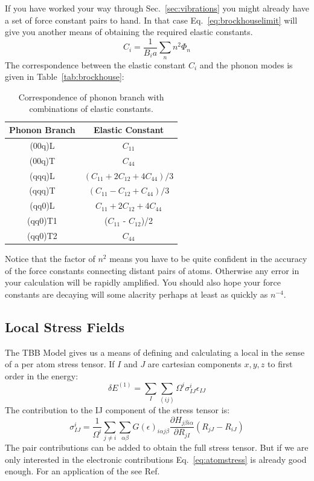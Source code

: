 If you have worked your way through Sec.~\ref{sec:vibrations} you might already have
a set of force constant pairs to hand. In that case Eq.~\ref{eq:brockhouselimit} will give you
another means of obtaining the required elastic constants.
%
\begin{equation}
\label{eq:brockhouselimit}
C_{i} = \frac{1}{B_{i}a}\sum_{n} n^{2}\Phi_{n}
\end{equation}
%
The correspondence between the elastic constant $C_{i}$ and the phonon modes is given
in Table~\ref{tab:brockhouse}:

\begin{table}
\begin{center}
\begin{tabular}{|c|c|}
\hline
Phonon Branch  & Elastic Constant \\
\hline
(00q)L  & $C_{11}$ \\
(00q)T  & $C_{44}$ \\
(qqq)L  & $(C_{11}+2C_{12}+4C_{44})/3$ \\
(qqq)T  & $(C_{11}-C_{12}+C_{44})/3$ \\
(qq0)L  & $C_{11}+2C_{12}+4C_{44}$ \\
(qq0)T1 & ($C_{11}$ - $C_{12}$)/2\\
(qq0)T2 & $C_{44}$\\
\hline
\end{tabular}

\caption{Correspondence of phonon branch with combinations of elastic constants.}
\end{center}
\end{table}

Notice that the factor of $n^{2}$ means you have to be quite confident in the accuracy of
the force constants connecting distant pairs of atoms. Otherwise any error
in your calculation will be rapidly amplified. You should also hope your force
constants are decaying will some alacrity perhaps at least as quickly as $n^{-4}$.

\subsection{Local Stress Fields}
The TBB Model \cite{nielsen83, sutton88} gives us a means of defining and calculating 
a local in the sense of a per atom stress tensor. If $I$ and $J$ 
are cartesian components $x,y,z$ to first order in the energy:
%
\begin{equation}
\delta E^(1) = \sum_{I} \sum_{(ij)}\Omega^{i}\sigma^{i}_{IJ}\epsilon_{IJ}
\end{equation}
%
The contribution to the IJ component of the stress tensor is:
%
\begin{equation}
\label{eq:atomstress}
\sigma^{i}_{IJ} = \frac{1}{\Omega^{i}}\sum_{j\neq i}\sum_{\alpha\beta}G(\epsilon)_{i\alpha j\beta}\frac{\partial H_{j\beta i\alpha}}{\partial R_{jI}}(R_{jJ}-R_{iJ})
\end{equation}
%
The pair contributions can be added to obtain the full stress tensor. 
But if we are only interested in the electronic contributions
Eq.~\ref{eq:atomstress} is already good enough. For an application of the 
see Ref.~\cite{ohta90}

